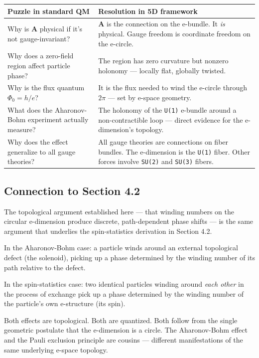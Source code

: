 \documentclass[aps,prd,preprint,superscriptaddress,longbibliography,floatfix]{revtex4-2}
\theoremstyle{remark}
\begin{document}
\begin{table}[H]
\begin{ruledtabular}
\begin{tabular}{p{7.5cm}p{7.5cm}}
Puzzle in standard QM & Resolution in 5D framework \\
\hline
Why is \textbf{A} physical if it's not gauge-invariant? & \textbf{A} is the connection on the e-bundle. It \textit{is} physical. Gauge freedom is coordinate freedom on the e-circle. \\
Why does a zero-field region affect particle phase? & The region has zero curvature but nonzero holonomy --- locally flat, globally twisted. \\
Why is the flux quantum $\Phi_{0} = h/e$? & It is the flux needed to wind the e-circle through $2\pi$ --- set by e-space geometry. \\
What does the Aharonov-Bohm experiment actually measure? & The holonomy of the \texttt{U(1)} e-bundle around a non-contractible loop --- direct evidence for the e-dimension's topology. \\
Why does the effect generalize to all gauge theories? & All gauge theories are connections on fiber bundles. The e-dimension is the \texttt{U(1)} fiber. Other forces involve \texttt{SU(2)} and \texttt{SU(3)} fibers. \\
\end{tabular}
\end{ruledtabular}
\end{table}



\subsection{Connection to Section 4.2}

The topological argument established here --- that winding numbers on the circular e-dimension produce discrete, path-dependent phase shifts --- is the same argument that underlies the spin-statistics derivation in Section 4.2.

In the Aharonov-Bohm case: a particle winds around an external topological defect (the solenoid), picking up a phase determined by the winding number of its path relative to the defect.

In the spin-statistics case: two identical particles winding around \textit{each other} in the process of exchange pick up a phase determined by the winding number of the particle's own e-structure (its spin).

Both effects are topological. Both are quantized. Both follow from the single geometric postulate that the e-dimension is a circle. The Aharonov-Bohm effect and the Pauli exclusion principle are cousins --- different manifestations of the same underlying e-space topology.
\end{document}
